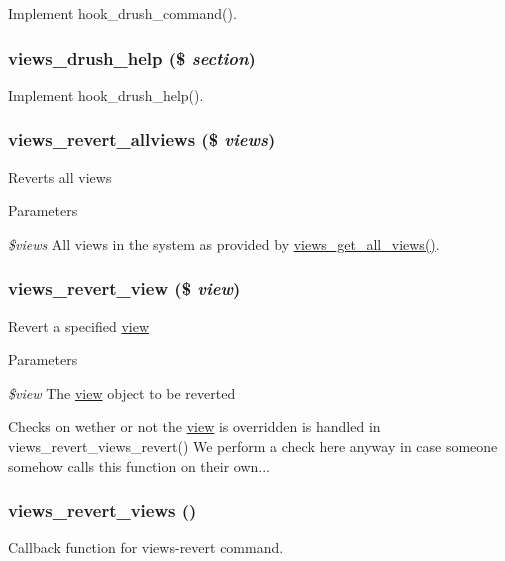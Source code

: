 Implement hook\_\-drush\_\-command(). \hypertarget{views_8drush_8inc_a7de61c9b85a05e7d03205bdce0e9faeb}{
\subsubsection[{views\_\-drush\_\-help}]{\setlength{\rightskip}{0pt plus 5cm}views\_\-drush\_\-help (\$ {\em section})}}
\label{views_8drush_8inc_a7de61c9b85a05e7d03205bdce0e9faeb}
Implement hook\_\-drush\_\-help(). \hypertarget{views_8drush_8inc_a81bc2fddd56367b1bb295de134a0332f}{
\subsubsection[{views\_\-revert\_\-allviews}]{\setlength{\rightskip}{0pt plus 5cm}views\_\-revert\_\-allviews (\$ {\em views})}}
\label{views_8drush_8inc_a81bc2fddd56367b1bb295de134a0332f}
Reverts all views 
\begin{DoxyParams}{Parameters}
\item[{\em \$views}]All views in the system as provided by \hyperlink{views_8module_ab1f0b4d2bc5c4a7db19554780f5779ea}{views\_\-get\_\-all\_\-views()}. \end{DoxyParams}
\hypertarget{views_8drush_8inc_a8fdaa6d6c222e3f1866fe8232b20aa4a}{
\subsubsection[{views\_\-revert\_\-view}]{\setlength{\rightskip}{0pt plus 5cm}views\_\-revert\_\-view (\$ {\em view})}}
\label{views_8drush_8inc_a8fdaa6d6c222e3f1866fe8232b20aa4a}
Revert a specified \hyperlink{classview}{view} 
\begin{DoxyParams}{Parameters}
\item[{\em \$view}]The \hyperlink{classview}{view} object to be reverted\end{DoxyParams}
Checks on wether or not the \hyperlink{classview}{view} is overridden is handled in views\_\-revert\_\-views\_\-revert() We perform a check here anyway in case someone somehow calls this function on their own... \hypertarget{views_8drush_8inc_ab7603b1903c64852058ca7c622eca5ff}{
\subsubsection[{views\_\-revert\_\-views}]{\setlength{\rightskip}{0pt plus 5cm}views\_\-revert\_\-views ()}}
\label{views_8drush_8inc_ab7603b1903c64852058ca7c622eca5ff}
Callback function for views-\/revert command. 